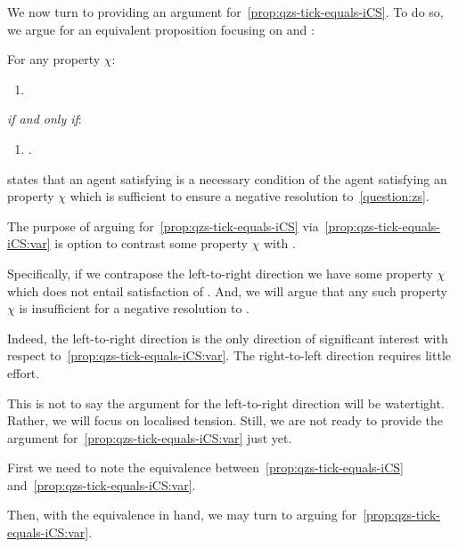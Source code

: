 \begin{note}
  We now turn to providing an argument for~\autoref{prop:qzs-tick-equals-iCS}.
  To do so, we argue for an equivalent proposition focusing on \qzS{} and \ZS{}:

  \begin{proposition}
    \label{prop:qzs-tick-equals-iCS:var}
    For any property \(\chi\):
    \begin{enumerate}[label=\Alph*.]
    \item
      \label{squish:A}
    \end{enumerate}
    \emph{if and only if}:
    \begin{enumerate}[label=\Alph*.,resume]
    \item
      \label{squish:B}
      .
    \end{enumerate}
    \vspace{-\baselineskip}
  \end{proposition}

   states that an agent satisfying \iZS{} is a necessary condition of the agent satisfying an property \(\chi\) which is sufficient to ensure a negative resolution to~\autoref{question:zs}.

  The purpose of arguing for~\autoref{prop:qzs-tick-equals-iCS} via~\autoref{prop:qzs-tick-equals-iCS:var} is option to contrast some property \(\chi\) with \ZS{}.

  Specifically, if we contrapose the left-to-right direction we have some property \(\chi\) which does not entail satisfaction of \iZS{}.
  And, we will argue that any such property \(\chi\) is insufficient for a negative resolution to \qzS{}.

  Indeed, the left-to-right direction is the only direction of significant interest with respect to~\autoref{prop:qzs-tick-equals-iCS:var}.
  The right-to-left direction requires little effort.

  This is not to say the argument for the left-to-right direction will be watertight.
  Rather, we will focus on localised tension.
  Still, we are not ready to provide the argument for~\autoref{prop:qzs-tick-equals-iCS:var} just yet.

  First we need to note the equivalence between~\autoref{prop:qzs-tick-equals-iCS} and~\autoref{prop:qzs-tick-equals-iCS:var}.

  Then, with the equivalence in hand, we may turn to arguing for~\autoref{prop:qzs-tick-equals-iCS:var}.
\end{note}

